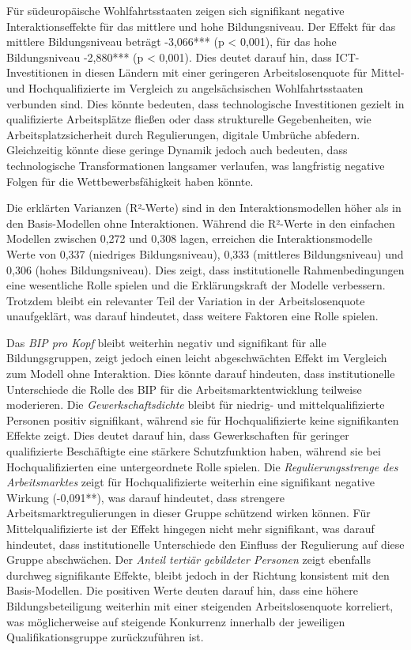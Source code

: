 Für südeuropäische Wohlfahrtsstaaten zeigen sich signifikant negative Interaktionseffekte für das 
mittlere und hohe Bildungsniveau. Der Effekt für das mittlere Bildungsniveau beträgt -3,066*** 
(p < 0,001), für das hohe Bildungsniveau -2,880*** (p < 0,001). Dies deutet darauf hin, dass 
\ac{ICT}-Investitionen in diesen Ländern mit einer geringeren Arbeitslosenquote für Mittel- und 
Hochqualifizierte im Vergleich zu angelsächsischen Wohlfahrtsstaaten verbunden sind. Dies könnte 
bedeuten, dass technologische Investitionen gezielt in qualifizierte Arbeitsplätze fließen oder 
dass strukturelle Gegebenheiten, wie Arbeitsplatzsicherheit durch Regulierungen, digitale 
Umbrüche abfedern. Gleichzeitig könnte diese geringe Dynamik jedoch auch bedeuten, dass 
technologische Transformationen langsamer verlaufen, was langfristig negative Folgen für die 
Wettbewerbsfähigkeit haben könnte.

Die erklärten Varianzen (R²-Werte) sind in den Interaktionsmodellen höher als in den 
Basis-Modellen ohne Interaktionen. Während die R²-Werte in den einfachen Modellen zwischen 
0,272 und 0,308 lagen, erreichen die Interaktionsmodelle Werte von 0,337 
(niedriges Bildungsniveau), 0,333 (mittleres Bildungsniveau) und 0,306 (hohes Bildungsniveau). 
Dies zeigt, dass institutionelle Rahmenbedingungen eine wesentliche Rolle spielen und die 
Erklärungskraft der Modelle verbessern. Trotzdem bleibt ein relevanter Teil der Variation in der 
Arbeitslosenquote unaufgeklärt, was darauf hindeutet, dass weitere Faktoren eine Rolle spielen.

Das \textit{\ac{BIP} pro Kopf} bleibt weiterhin negativ und signifikant für alle Bildungsgruppen, 
zeigt jedoch einen leicht abgeschwächten Effekt im Vergleich zum Modell ohne Interaktion. Dies 
könnte darauf hindeuten, dass institutionelle Unterschiede die Rolle des 
\ac{BIP} für die Arbeitsmarktentwicklung teilweise moderieren. Die \textit{Gewerkschaftsdichte} 
bleibt für niedrig- und mittelqualifizierte Personen positiv signifikant, während sie für 
Hochqualifizierte keine signifikanten Effekte zeigt. Dies deutet darauf hin, dass Gewerkschaften 
für geringer qualifizierte Beschäftigte eine stärkere Schutzfunktion haben, während sie bei 
Hochqualifizierten eine untergeordnete Rolle spielen. Die 
\textit{Regulierungsstrenge des Arbeitsmarktes} zeigt für Hochqualifizierte weiterhin eine 
signifikant negative Wirkung (-0,091**), was darauf hindeutet, dass strengere 
Arbeitsmarktregulierungen in dieser Gruppe schützend wirken können. Für Mittelqualifizierte ist 
der Effekt hingegen nicht mehr signifikant, was darauf hindeutet, dass institutionelle 
Unterschiede den Einfluss der Regulierung auf diese Gruppe abschwächen. Der 
\textit{Anteil tertiär gebildeter Personen} zeigt ebenfalls durchweg signifikante Effekte, bleibt 
jedoch in der Richtung konsistent mit den Basis-Modellen. Die positiven Werte deuten darauf hin, 
dass eine höhere Bildungsbeteiligung weiterhin mit einer steigenden Arbeitslosenquote korreliert, 
was möglicherweise auf steigende Konkurrenz innerhalb der jeweiligen Qualifikationsgruppe 
zurückzuführen ist.

